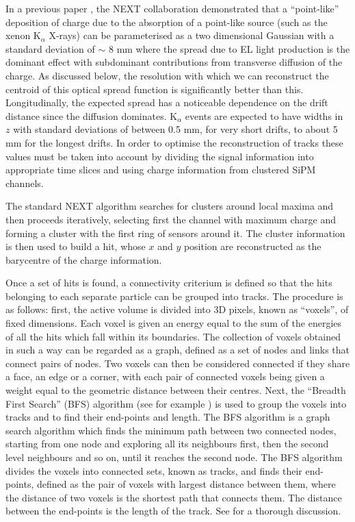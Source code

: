 \documentclass[a4paper,11pt]{article}
\begin{document}
In a previous paper \cite{Lorca:2014sra}, the NEXT collaboration demonstrated that a ``point-like''
deposition of charge due to the absorption of a point-like source (such as the xenon K$_\alpha$ X-rays) can be parameterised as a two dimensional Gaussian with a standard deviation of $\sim$ 8 mm where the spread due to EL light production is the dominant effect with subdominant contributions from transverse diffusion of the charge. As discussed below, the resolution with which we can reconstruct the centroid of this optical spread function is significantly better than this. Longitudinally, the expected spread has a noticeable dependence on the drift distance since the diffusion dominates. K$_\alpha$ events are expected to have widths in $z$ with standard deviations of between 0.5 mm, for very short drifts, to about 5 mm for the longest drifts. In order to optimise the reconstruction of tracks these values must be taken into account by dividing the signal information into appropriate time slices and using charge information from clustered SiPM channels.

The standard NEXT algorithm searches for clusters around local maxima and then proceeds iteratively, selecting first the channel with maximum charge and forming a cluster with the first ring of sensors around it. The cluster information is then used to build a hit, whose $x$ and $y$ position are reconstructed as the barycentre of the charge information. 

Once a set of hits is found, a connectivity criterium is  defined so that the hits belonging to each separate particle can be grouped into tracks. The procedure is as follows: first, the active volume is divided into 3D pixels, known as ``voxels'', of fixed dimensions. Each voxel is given an energy equal to the sum of the energies of all the hits which fall within its boundaries. The collection of voxels obtained in such a way can be regarded as a graph, defined as a set of nodes and links that connect pairs of nodes. Two voxels can then be considered connected if they share a face, an edge or a corner, with each pair of connected voxels being given a weight equal to the geometric distance between their centres. Next, the ``Breadth First Search'' (BFS) algorithm (see for example \cite{Cormen_2001}) is used to group the voxels into tracks and to find their end-points and length. The BFS algorithm is a graph search algorithm which finds the minimum path between two connected nodes, starting from one node and exploring all its neighbours first, then the second level neighbours and so on, until it reaches the second node. The BFS algorithm divides the voxels into connected sets, known as tracks, and finds their end-points, defined as the pair of voxels with largest distance between them, where the distance of two voxels is the shortest path that connects them. The distance between the end-points is the length of the track. See \cite{NEXT_topology} for a thorough discussion.
\end{document}
